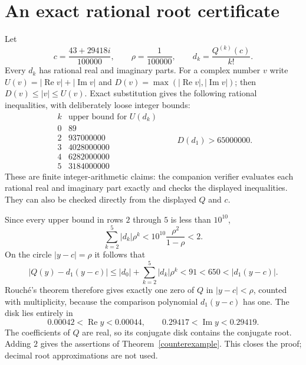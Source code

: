 \documentclass[11pt]{article}
\begin{document}
\section{An exact rational root certificate}
Let
\[
 c=\frac{43+29418i}{100000},\qquad \rho=\frac1{100000},\qquad
 d_k=\frac{Q^{(k)}(c)}{k!}.
\]
Every $d_k$ has rational real and imaginary parts. For a complex number $v$
write $U(v)=|\operatorname{Re}v|+|\operatorname{Im}v|$ and
$D(v)=\max(|\operatorname{Re}v|,|\operatorname{Im}v|)$; then
$D(v)\leq|v|\leq U(v)$. Exact substitution gives the following rational
inequalities, with deliberately loose integer bounds:
\[
\begin{array}{c|r}
 k&\text{upper bound for }U(d_k)\\\hline
 0&89\\
 2&937000000\\
 3&4028000000\\
 4&6282000000\\
 5&3184000000
\end{array}
\qquad D(d_1)>65000000.
\]
These are finite integer-arithmetic claims: the companion verifier evaluates
each rational real and imaginary part exactly and checks the displayed
inequalities. They can also be checked directly from the displayed $Q$ and $c$.

Since every upper bound in rows $2$ through $5$ is less than $10^{10}$,
\[
 \sum_{k=2}^5 |d_k|\rho^k
 <10^{10}\frac{\rho^2}{1-\rho}<2.
\]
On the circle $|y-c|=\rho$ it follows that
\[
 |Q(y)-d_1(y-c)|
 \leq |d_0|+\sum_{k=2}^5|d_k|\rho^k
 <91<650<|d_1(y-c)|.
\]
Rouch\'e's theorem therefore gives exactly one zero of $Q$ in
$|y-c|<\rho$, counted with multiplicity, because the comparison polynomial
$d_1(y-c)$ has one. The disk lies entirely in
\[
 0.00042<\operatorname{Re}y<0.00044,
 \qquad 0.29417<\operatorname{Im}y<0.29419.
\]
The coefficients of $Q$ are real, so its conjugate disk contains the
conjugate root. Adding $2$ gives the assertions of Theorem~\ref{counterexample}.
This closes the proof; decimal root approximations are not used.
\end{document}
